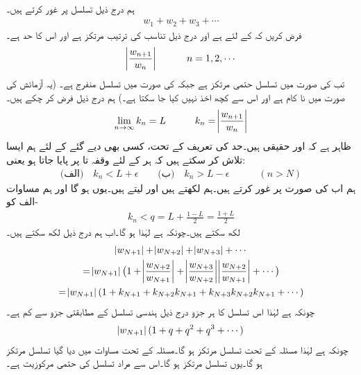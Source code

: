 \quad {}\\
ہم درج ذیل تسلسل پر غور کرتے ہیں۔
\begin{align*}
w_1+w_2+w_3+\cdots
\end{align*}
فرض کریں کہ  کے لئے  ہے اور درج ذیل تناسب کی ترتیب مرتکز ہے اور اس  کا حد  ہے۔
\begin{align*}
\abs{\frac{w_{n+1}}{w_n}}\quad \quad \quad n=1,2,\cdots
\end{align*}
تب  کی صورت میں تسلسل حتمی مرتکز ہے جبکہ  کی صورت میں تسلسل منفرج ہے۔ (یہ آزمائش  کی صورت میں نا کام ہے اور اس سے کچھ اخذ نہیں کیا جا سکتا ہے۔)
\quad
ہم درج ذیل فرض کر چکے ہیں۔
\begin{align*}
\lim_{n\to\infty} k_n=L \quad \quad \quad k_n=\abs{\frac{w_{n+1}}{w_n}}
\end{align*}
ظاہر ہے کہ  اور  حقیقی ہیں۔حد کی تعریف کے تحت، کسی بھی دیے گئے  کے لئے ہم ایسا  تلاش کر سکتے ہیں کہ ہر  کے لئے  وقفہ  تا  پر پایا جاتا ہو یعنی:
\begin{align}\label{مساوات_ترتیب_نسبت_الف}
\text{(الف)}\quad k_n<L+\epsilon \quad \quad \text{(ب)}\quad k_n>L-\epsilon\quad \quad \quad (n>N)
\end{align}
ہم اب  کی صورت پر غور کرتے ہیں۔ہم  لکھتے ہیں اور  لیتے ہیں۔یوں  ہو گا اور ہم  مساوات -الف کو
\begin{align*}
k_n<q=L+\frac{1-L}{2}=\frac{1+L}{2}
\end{align*}
لکھ سکتے ہیں۔چونکہ  ہے لہٰذا  ہو گا۔اب ہم درج ذیل لکھ سکتے ہیں۔
\begin{multline}\label{مساوات_ترتیب_نسبت_ب}
\abs{w_{N+1}}+\abs{w_{N+2}}+\abs{w_{N+3}}+\cdots\\
=\abs{w_{N+1}}\big(1+\abs{\frac{w_{N+2}}{w_{N+1}}}+\abs{\frac{w_{N+3}}{w_{N+2}}}\abs{\frac{w_{N+2}}{w_{N+1}}}+\cdots\big)\\
=\abs{w_{N+1}}(1+k_{N+1}+k_{N+2}k_{N+1}+k_{N+3}k_{N+2}k_{N+1}+\cdots)
\end{multline}
چونکہ  ہے لہٰذا اس تسلسل کا ہر جزو درج ذیل ہندسی تسلسل کے مطابقتی جزو سے کم ہے۔
\begin{align*}
\abs{w_{N+1}}(1+q+q^2+q^3+\cdots)
\end{align*}
چونکہ  ہے لہٰذا مسئلہ  کے تحت تسلسل مرتکز ہو گا۔مسئلہ  کے تحت  مساوات  میں دیا گیا تسلسل مرتکز ہو گا۔یوں تسلسل  مرتکز ہو گا۔اس سے مراد تسلسل  کی حتمی مرکوزیت ہے۔


